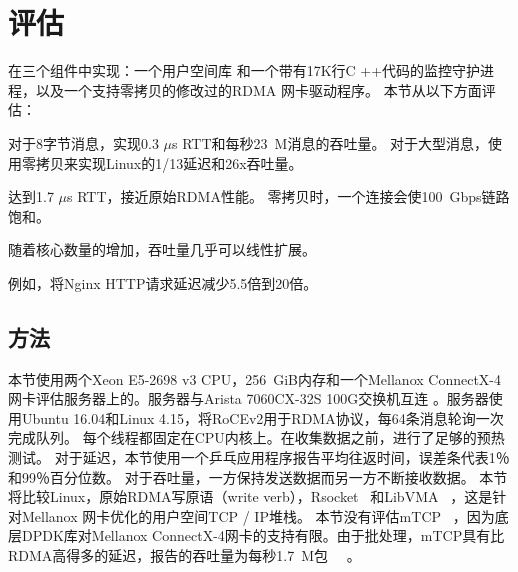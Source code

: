 \section{评估}
\label{socksdirect:sec:evaluation}



\sys{} 在三个组件中实现：一个用户空间库 \libipc {} 和一个带有17K行C ++代码的监控守护进程，以及一个支持零拷贝的修改过的RDMA 网卡驱动程序。
本节从以下方面评估\sys{}：

对于8字节消息，\sys 实现0.3 $\mu$s RTT和每秒23~M消息的吞吐量。 对于大型消息，\sys 使用零拷贝来实现Linux的1/13延迟和26x吞吐量。

\sys 达到1.7 $\mu$s RTT，接近原始RDMA性能。
零拷贝时，一个连接会使100~Gbps链路饱和。



随着核心数量的增加，吞吐量几乎可以线性扩展。


例如，\sys  {}将Nginx HTTP请求延迟减少5.5倍到20倍。


\subsection{方法}
\label{socksdirect:subsec:methodology}

本节使用两个Xeon E5-2698 v3 CPU，256~GiB内存和一个Mellanox ConnectX-4网卡评估服务器上的\sys{}。服务器与Arista 7060CX-32S 100G交换机互连 \cite {arista-7060cx}。服务器使用Ubuntu 16.04和Linux 4.15，将RoCEv2用于RDMA协议，每64条消息轮询一次完成队列。
每个线程都固定在CPU内核上。在收集数据之前，进行了足够的预热测试。
对于延迟，本节使用一个乒乓应用程序报告平均往返时间，误差条代表1％和99％百分位数。
对于吞吐量，一方保持发送数据而另一方不断接收数据。
本节将比较Linux，原始RDMA写原语（write verb），Rsocket~ \cite {rsockets}和LibVMA~ \cite {libvma}，这是针对Mellanox 网卡优化的用户空间TCP / IP堆栈。
本节没有评估mTCP~ \cite {jeong2014mtcp}，因为底层DPDK库对Mellanox ConnectX-4网卡的支持有限。由于批处理，mTCP具有比RDMA高得多的延迟，报告的吞吐量为每秒1.7~M包~~ \cite {kalia2018datacenter}。

